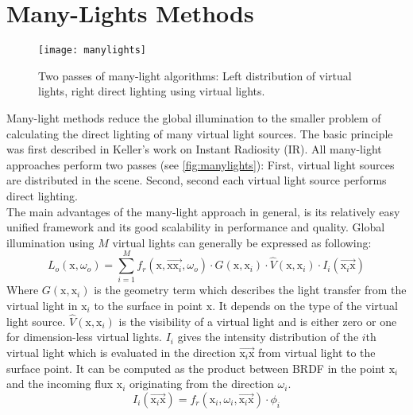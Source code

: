 \documentclass[thesis.tex]{subfiles}
\begin{document}
\section {Many-Lights Methods} \label{sec:prev:manylights}
\begin{figure}[h]
	\centering
	\texttt{[image: manylights]}
	\caption{\cite{bib:manylightssurvey2014} Two passes of many-light algorithms: Left distribution of virtual lights, right direct lighting using virtual lights.} \label{fig:manylights}
\end{figure}
Many-light methods reduce the global illumination to the smaller problem of calculating the direct lighting of many virtual light sources.
The basic principle was first described in Keller's work on Instant Radiosity \cite{bib:instantradiosity} (IR).
All many-light approaches perform two passes (see \autoref{fig:manylights}):
First, virtual light sources are distributed in the scene.
Second, second each virtual light source performs direct lighting.
\\
The main advantages of the many-light approach in general, is its relatively easy unified framework and its good scalability in performance and quality.
Global illumination using $M$ virtual lights can generally be expressed as following:
\begin{equation}
L_o(\mathrm{x}, \omega_o) = \sum\limits_{i=1}^{M} f_r(\mathrm{x}, \overrightarrow{\mathrm{x}\mathrm{x}_i}, \omega_o) \cdot G(\mathrm{x}, \mathrm{x}_i) \cdot \hat{V}(\mathrm{x}, \mathrm{x}_i) \cdot I_i(\overrightarrow{\mathrm{x}_i\mathrm{x}})
\end{equation}
Where $G(\mathrm{x}, \mathrm{x}_i)$ is the geometry term which describes the light transfer from the virtual light in $\mathrm{x}_i$ to the surface in point $\mathrm{x}$.
It depends on the type of the virtual light source.
$\hat{V}(\mathrm{x}, \mathrm{x}_i)$ is the visibility of a virtual light and is either zero or one for dimension-less virtual lights. %
$I_i$ gives the intensity distribution of the $i$th virtual light which is evaluated in the direction $\overrightarrow{\mathrm{x}_i\mathrm{x}}$ from virtual light to the surface point.
It can be computed as the product between BRDF in the point $\mathrm{x}_i$ and the incoming flux $\mathrm{x}_i$ originating from the direction $\omega_i$.
\begin{equation}
I_i(\overrightarrow{\mathrm{x}_i\mathrm{x}}) = f_r(\mathrm{x}_i, \omega_i, \overrightarrow{\mathrm{x}_i\mathrm{x}}) \cdot \phi_i
\end{equation}
 
\end{document}
